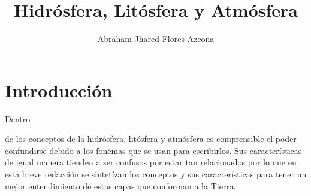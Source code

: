 \documentclass[stu, 12pt, letterpaper, donotrepeattitle, floatsintext, natbib]{apa7}
\title{\Large Hidrósfera, Litósfera y Atmósfera}
\author{Abraham Jhared Flores Azcona} %
\affiliation{Instituto Tecnológico de Tijuana}
\begin{document}
\maketitle


\renewcommand\contentsname{Contenido}
\tableofcontents
\renewcommand{\listfigurename}{Figuras}
\listoffigures

\newpage
\section*{Introducción}
Dentro \begin{justifying}
    de los conceptos de la hidrósfera, litósfera y atmósfera es comprensible el poder confundirse debido a los fonémas
    que se usan para escribirlos. Sus características de igual manera tienden a ser confusos por estar tan relacionados por lo que en esta breve
    redacción se sintetízan los conceptos y sus características para tener un mejor entendimiento de estas capas que conforman a la Tierra.\par
\end{justifying}
\end{document}
